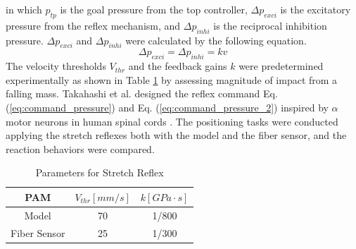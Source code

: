 in which $p_{tp}$ is the goal pressure from the top controller, $\Delta p_{exci}$ is the excitatory pressure from the reflex mechanism, and $ \Delta p_{inhi}$ is the reciprocal inhibition pressure. 
$\Delta p_{exci}$ and $\Delta p_{inhi}$ were calculated by the following equation.
\begin{equation}
    \label{eq:reflex_pressure}
    \Delta p_{exci} =  \Delta p_{inhi} = kv
\end{equation}
The velocity thresholds $V_{thr}$ and the feedback gains $k$ were predetermined experimentally as shown in Table \ref{tab:reflex_para} by assessing magnitude of impact from a falling mass. Takahashi et al. designed the reflex command Eq. (\ref{eq:command_pressure}) and Eq. (\ref{eq:command_pressure_2}) inspired by $\alpha$ motor neurons in human spinal cords \cite{takahashi}. The positioning tasks were conducted applying the stretch reflexes both with the model and the fiber sensor, and the reaction behaviors were compared.
\begin{table}[h]
    \centering
    \caption{Parameters for Stretch Reflex} 
    \begin{tabular}{c|cc}
        \hline
        PAM &$V_{thr} [\si{mm/s}]$&$ k [\si{GPa\cdot s}]$\\
        \hline \hline
        Model & 70 & 1/800\\
        Fiber Sensor & 25 & 1/300\\
        \hline
    \end{tabular}
\label{tab:reflex_para}
\end{table}
